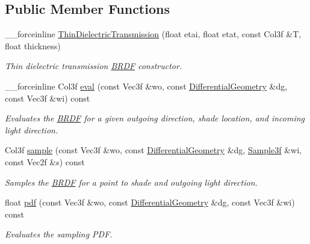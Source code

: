\subsection*{Public Member Functions}
\begin{DoxyCompactItemize}
\item 
\_\-\_\-forceinline \hyperlink{classembree_1_1_thin_dielectric_transmission_a0e1dfd481db7b1608947e764b7b8a71d}{ThinDielectricTransmission} (float etai, float etat, const Col3f \&T, float thickness)
\begin{DoxyCompactList}\small\item\em Thin dielectric transmission \hyperlink{classembree_1_1_b_r_d_f}{BRDF} constructor. \item\end{DoxyCompactList}\item 
\_\-\_\-forceinline Col3f \hyperlink{classembree_1_1_thin_dielectric_transmission_aa3dd6150a5adb7e55861585b5388c90b}{eval} (const Vec3f \&wo, const \hyperlink{structembree_1_1_differential_geometry}{DifferentialGeometry} \&dg, const Vec3f \&wi) const 
\begin{DoxyCompactList}\small\item\em Evaluates the \hyperlink{classembree_1_1_b_r_d_f}{BRDF} for a given outgoing direction, shade location, and incoming light direction. \item\end{DoxyCompactList}\item 
Col3f \hyperlink{classembree_1_1_thin_dielectric_transmission_a16c3d81fce553abe112741189f138e36}{sample} (const Vec3f \&wo, const \hyperlink{structembree_1_1_differential_geometry}{DifferentialGeometry} \&dg, \hyperlink{structembree_1_1_sample}{Sample3f} \&wi, const Vec2f \&s) const 
\begin{DoxyCompactList}\small\item\em Samples the \hyperlink{classembree_1_1_b_r_d_f}{BRDF} for a point to shade and outgoing light direction. \item\end{DoxyCompactList}\item 
float \hyperlink{classembree_1_1_thin_dielectric_transmission_a9b3ee34fefe0d9207a9daf0120054b73}{pdf} (const Vec3f \&wo, const \hyperlink{structembree_1_1_differential_geometry}{DifferentialGeometry} \&dg, const Vec3f \&wi) const 
\begin{DoxyCompactList}\small\item\em Evaluates the sampling PDF. \item\end{DoxyCompactList}\end{DoxyCompactItemize}


